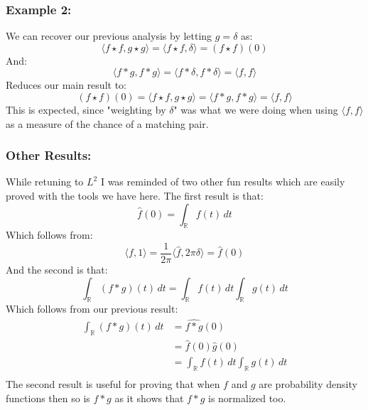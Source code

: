 \subsubsection{Example 2:}
We can recover our previous analysis by letting $g=\delta$ as:
\[\langle f\star f,g\star g\rangle = \langle f\star f,\delta\rangle = (f\star f)(0)\]
And:
\[\langle f*g,f*g\rangle = \langle f*\delta,f*\delta\rangle = \langle f,f \rangle\]
Reduces our main result to:
\[(f\star f)(0) = \langle f\star f,g\star g\rangle = \langle f*g,f*g\rangle = \langle f,f\rangle\]
This is expected,
since "weighting by $\delta$" was what we were doing when using $\langle f,f\rangle$ as a measure of the chance of a matching pair.

\subsubsection{Other Results:}
While retuning to $L^2$ I was reminded of two other fun results which are easily proved with the tools we have here.
The first result is that:
\[\hat{f}(0) = \int_{\mathbb{R}}f(t)\,dt\]
Which follows from:
\[\langle f,1\rangle = \frac{1}{2\pi}\langle\hat{f},2\pi\delta\rangle = \hat{f}(0) \]
And the second is that:
\[ \int_{\mathbb{R}}(f*g)(t)\,dt = \int_{\mathbb{R}}f(t)\,dt\int_{\mathbb{R}}g(t)\,dt\]
Which follows from our previous result:
\[\begin{aligned}
	\int_{\mathbb{R}}(f*g)(t)\,dt &= \widehat{f*g}(0) \\
	&= \hat{f}(0)\hat{g}(0)\\
	&= \int_{\mathbb{R}}f(t)\,dt\int_{\mathbb{R}}g(t)\,dt\\
\end{aligned}\]
The second result is useful for proving that when $f$ and $g$ are probability density functions then so is $f*g$ as it shows that $f*g$ is normalized too.
